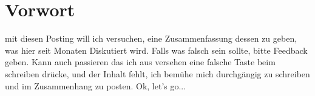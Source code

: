 \chapter{Vorwort}
mit diesen Posting will ich versuchen, eine Zusammenfassung
dessen zu geben, was hier seit Monaten Diskutiert wird.
Falls was falsch sein sollte, bitte Feedback geben.
Kann auch passieren das ich aus versehen eine falsche Taste
beim schreiben drücke, und der Inhalt fehlt, ich bemühe mich
durchgängig zu schreiben und im Zusammenhang zu posten.
Ok, let's go...

